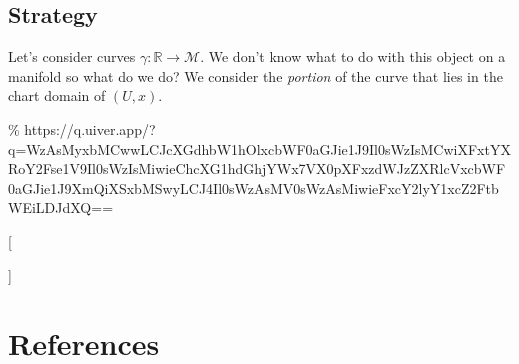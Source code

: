 \documentclass[
  letterpaper,
  DIV=11,
  numbers=noendperiod,
  oneside]{scrreprt}
\begin{document}
\hypertarget{strategy}{%
\section{Strategy}\label{strategy}}

Let's consider curves \(\gamma: \mathbb{R} \to \mathcal{M}\). We don't
know what to do with this object on a manifold so what do we do? We
consider the \emph{portion} of the curve that lies in the chart domain
of \((U, x)\).

\%
https://q.uiver.app/?q=WzAsMyxbMCwwLCJcXGdhbW1hOlxcbWF0aGJie1J9Il0sWzIsMCwiXFxtYXRoY2Fse1V9Il0sWzIsMiwieChcXG1hdGhjYWx7VX0pXFxzdWJzZXRlcVxcbWF0aGJie1J9XmQiXSxbMSwyLCJ4Il0sWzAsMV0sWzAsMiwieFxcY2lyY1xcZ2FtbWEiLDJdXQ==

\usepackage{tikz-cd}

{[}


{]}


\hypertarget{references}{%
\chapter*{References}\label{references}}
\end{document}
